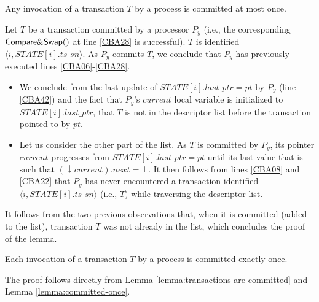 \begin{lemma}
\label{lemma:committed-once}
Any invocation of a transaction $T$ by a process is  committed at most once.
\end{lemma}

\begin{proofL}
Let $T$ be a transaction committed by a processor $P_y$ (i.e., 
the corresponding ${\sf Compare\&Swap}()$ at line \ref{CBA28} is successful). 
$T$ is identified $\langle  i, \mathit{STATE}[i].ts\_sn \rangle$.
As  $P_y$ commits  $T$,  we conclude that $P_y$ has previously 
executed lines \ref{CBA06}-\ref{CBA28}. 
\begin{itemize}
\item 
We conclude from  the last update of $\mathit{STATE}[i].last\_ptr=pt$ by $P_y$
(line \ref{CBA42}) and  the fact that $P_y$'s $current$ local variable is 
initialized  to   $\mathit{STATE}[i].last\_ptr$,  that  $T$ is not in the 
descriptor list before the transaction pointed to by $pt$. 
\item 
Let us consider the other part of the list. 
As $T$ is committed by $P_y$, its pointer  $current$  progresses from 
 $\mathit{STATE}[i].last\_ptr=pt$ until its last value that is  such that
$(\downarrow current).next=\bot$.  It then follows from 
lines \ref{CBA08} and  \ref{CBA22} that  $P_y$ has never 
encountered a  transaction identified  
$\langle  i, \mathit{STATE}[i].ts\_sn \rangle$ (i.e., $T$) 
while traversing the descriptor list. 
\end{itemize}
It follows from the two previous observations  that, 
when it  is committed (added to  the list), transaction $T$ was not already
in the list, which concludes the proof of  the lemma. 
\renewcommand{\toto}{lemma:committed-once}
\end{proofL}

\begin{lemma}
\label{lemma:trans-code}
Each invocation of a transaction $T$ by a process  is committed exactly once.
\end{lemma}

\begin{proofL}
The proof follows directly from Lemma \ref{lemma:transactions-are-committed}
and Lemma \ref{lemma:committed-once}.
\renewcommand{\toto}{lemma:trans-code}
\end{proofL}




